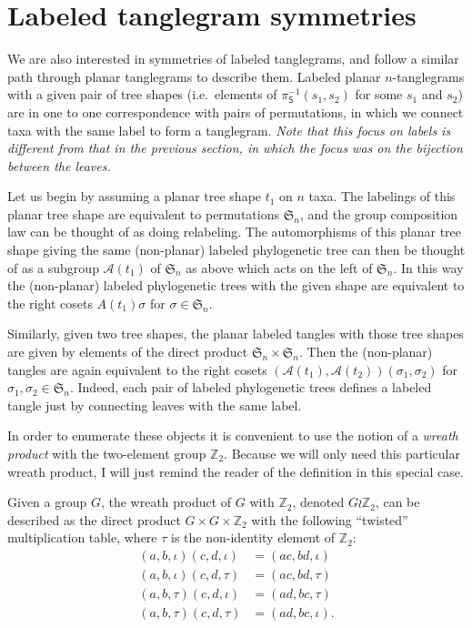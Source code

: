 \documentclass{amsart}
\newcommand{\ZZ}{\mathbb Z}
\newcommand{\fS}{\mathfrak S}
\newcommand{\aut}{\mathcal A}
\newcommand{\shape}{\mathsf{S}}
\newcommand{\id}{\iota}
\newcommand{\wrtwo}{\wr \ZZ_2}
\begin{document}
\section{Labeled tanglegram symmetries}
We are also interested in symmetries of labeled tanglegrams, and follow a similar path through planar tanglegrams to describe them.
Labeled planar $n$-tanglegrams with a given pair of tree shapes (i.e.\ elements of $\pi_\shape^{-1}(s_1, s_2)$ for some $s_1$ and $s_2$) are in one to one correspondence with pairs of permutations, in which we connect taxa with the same label to form a tanglegram.
\emph{Note that this focus on labels is different from that in the previous section, in which the focus was on the bijection between the leaves.}

Let us begin by assuming a planar tree shape $t_1$ on $n$ taxa.
The labelings of this planar tree shape are equivalent to permutations $\fS_n$, and the group composition law can be thought of as doing relabeling.
The automorphisms of this planar tree shape giving the same (non-planar) labeled phylogenetic tree can then be thought of as a subgroup $\aut(t_1)$ of $\fS_n$ as above which acts on the left of $\fS_n$.
In this way the (non-planar) labeled phylogenetic trees with the given shape are equivalent to the right cosets $A(t_1) \sigma$ for $\sigma \in \fS_n$.

Similarly, given two tree shapes, the planar labeled tangles with those tree shapes are given by elements of the direct product $\fS_n \times \fS_n$.
Then the (non-planar) tangles are again equivalent to the right cosets $(\aut(t_1), \aut(t_2)) (\sigma_1, \sigma_2)$ for $\sigma_1, \sigma_2 \in \fS_n$.
Indeed, each pair of labeled phylogenetic trees defines a labeled tangle just by connecting leaves with the same label.

In order to enumerate these objects it is convenient to use the notion of a \emph{wreath product} with the two-element group $\ZZ_2$.
Because we will only need this particular wreath product, I will just remind the reader of the definition in this special case.

Given a group $G$, the wreath product of $G$ with $\ZZ_2$, denoted $G \wrtwo$, can be described as the direct product $G \times G \times \ZZ_2$ with the following ``twisted'' multiplication table, where $\tau$ is the non-identity element of $\ZZ_2$:
\begin{align*}
(a, b, \id) (c, d, \id) & = (ac, bd, \id) \\
(a, b, \id) (c, d, \tau) & = (ac, bd, \tau) \\
(a, b, \tau) (c, d, \id) & = (ad, bc, \tau) \\
(a, b, \tau) (c, d, \tau) & = (ad, bc, \id).
\end{align*}
\end{document}
